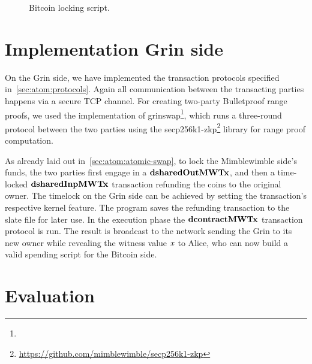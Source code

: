 \begin{figure}
    \begin{center}
    \end{center}
    \caption{Bitcoin locking script.}\label{fig:bitcoin-script}
\end{figure}

\section{Implementation Grin side}\label{sec:ImplementationGrin}

On the Grin side, we have implemented the transaction protocols specified in~\cref{sec:atom:protocols}.
Again all communication between the transacting parties happens via a secure TCP channel.
For creating two-party Bulletproof range proofs, we used the implementation of grinswap\footnote{\urlgrnswp}, which runs a three-round protocol between the two parties using the secp256k1-zkp\footnote{\url{https://github.com/mimblewimble/secp256k1-zkp}} library for range proof computation.

As already laid out in~\cref{sec:atom:atomic-swap}, to lock the Mimblewimble side's funds, the two parties first engage in a $\mathbf{dsharedOutMWTx}$, and then a time-locked $\mathbf{dsharedInpMWTx}$ transaction refunding the coins to the original owner.
The timelock on the Grin side can be achieved by setting the transaction's respective kernel feature.
The program saves the refunding transaction to the slate file for later use.
In the execution phase the $\mathbf{dcontractMWTx}$ transaction protocol is run.
The result is broadcast to the network sending the Grin to its new owner while revealing the witness value $\mathit{x}$ to Alice, who can now build a valid spending script for the Bitcoin side.

\section{Evaluation}

